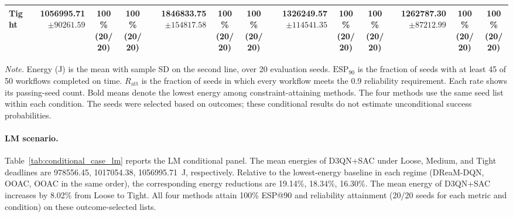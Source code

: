 \begin{table}[!t]
\begin{tabular}{@{}l*{4}{rcc}@{}}
Tight & \shortstack[r]{\textbf{1056995.71}\\$\pm 90261.59$} & \shortstack[c]{100\%\\(20/20)} & \shortstack[c]{100\%\\(20/20)} & \shortstack[r]{1846833.75\\$\pm 154817.58$} & \shortstack[c]{100\%\\(20/20)} & \shortstack[c]{100\%\\(20/20)} & \shortstack[r]{1326249.57\\$\pm 114541.35$} & \shortstack[c]{100\%\\(20/20)} & \shortstack[c]{100\%\\(20/20)} & \shortstack[r]{1262787.30\\$\pm 87212.99$} & \shortstack[c]{100\%\\(20/20)} & \shortstack[c]{100\%\\(20/20)} \\
\bottomrule
\end{tabular}
\par\vspace{3pt}
\parbox{\textwidth}{\footnotesize
\textit{Note.} Energy (J) is the mean with sample SD on the second line, over 20 evaluation seeds.
$\mathrm{ESP}_{90}$ is the fraction of seeds with at least 45 of 50 workflows completed on time.
$R_{\mathrm{att}}$ is the fraction of seeds in which every workflow meets the 0.9 reliability requirement.
Each rate shows its passing-seed count. Bold means denote the lowest energy among constraint-attaining methods.
The four methods use the same seed list within each condition.
The seeds were selected based on outcomes; these conditional results do not estimate unconditional success probabilities.}
\endgroup
\end{table}

\paragraph{LM scenario.}
Table~\ref{tab:conditional_case_lm} reports the LM conditional panel. The mean energies of D3QN+SAC under Loose, Medium, and Tight deadlines are 978556.45, 1017054.38, 1056995.71~J, respectively. Relative to the lowest-energy baseline in each regime (DReaM-DQN, OOAC, OOAC in the same order), the corresponding energy reductions are 19.14\%, 18.34\%, 16.30\%. The mean energy of D3QN+SAC increases by 8.02\% from Loose to Tight. All four methods attain 100\% ESP@90 and reliability attainment (20/20 seeds for each metric and condition) on these outcome-selected lists.

